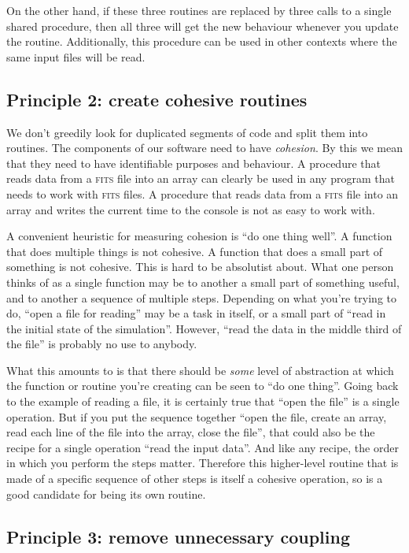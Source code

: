 \documentclass[a4paper]{article}
\begin{document}
On the other hand, if these three routines are replaced by three calls to a single shared procedure, then all three will get the new behaviour whenever you update the routine.
Additionally, this procedure can be used in other contexts where the same input files will be read.

\subsection {Principle 2: create cohesive routines}

We don't greedily look for duplicated segments of code and split them into routines.
The components of our software need to have \textit{cohesion}.
By this we mean that they need to have identifiable purposes and behaviour.
A procedure that reads data from a \textsc{fits} file into an array can clearly be used in any program that needs to work with \textsc{fits} files.
A procedure that reads data from a \textsc{fits} file into an array and writes the current time to the console is not as easy to work with.

A convenient heuristic for measuring cohesion is ``do one thing well''.
A function that does multiple things is not cohesive.
A function that does a small part of something is not cohesive.
This is hard to be absolutist about.
What one person thinks of as a single function may be to another a small part of something useful, and to another a sequence of multiple steps.
Depending on what you're trying to do, ``open a file for reading'' may be a task in itself, or a small part of ``read in the initial state of the simulation''.
However, ``read the data in the middle third of the file'' is probably no use to anybody.

What this amounts to is that there should be \textit{some} level of abstraction at which the function or routine you're creating can be seen to ``do one thing''.
Going back to the example of reading a file, it is certainly true that ``open the file'' is a single operation.
But if you put the sequence together ``open the file, create an array, read each line of the file into the array, close the file'', that could also be the recipe for a single operation ``read the input data''.
And like any recipe, the order in which you perform the steps matter.
Therefore this higher-level routine that is made of a specific sequence of other steps is itself a cohesive operation, so is a good candidate for being its own routine.

\subsection {Principle 3: remove unnecessary coupling}
\end{document}

